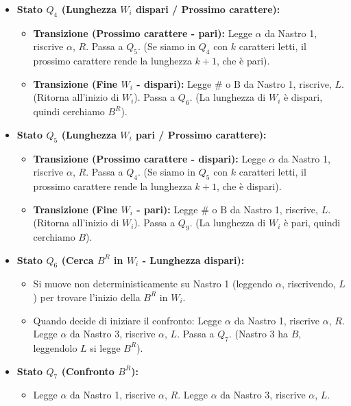 \documentclass[a4paper, 11pt]{book} %
\theoremstyle{definition}
\newcommand{\B}{\text{B}} %
\begin{document}
\begin{itemize}
    \item \textbf{Stato $Q_4$ (Lunghezza $W_i$ dispari / Prossimo carattere):}
        \begin{itemize}
            \item \textbf{Transizione (Prossimo carattere - pari):}
                Legge $\alpha$ da Nastro 1, riscrive $\alpha$, $R$. Passa a $Q_5$.
                (Se siamo in $Q_4$ con $k$ caratteri letti, il prossimo carattere rende la lunghezza $k+1$, che è pari).
            \item \textbf{Transizione (Fine $W_i$ - dispari):}
                Legge $\#$ o $\B$ da Nastro 1, riscrive, $L$. (Ritorna all'inizio di $W_i$).
                Passa a $Q_6$. (La lunghezza di $W_i$ è dispari, quindi cerchiamo $B^R$).
        \end{itemize}
    \item \textbf{Stato $Q_5$ (Lunghezza $W_i$ pari / Prossimo carattere):}
        \begin{itemize}
            \item \textbf{Transizione (Prossimo carattere - dispari):}
                Legge $\alpha$ da Nastro 1, riscrive $\alpha$, $R$. Passa a $Q_4$.
                (Se siamo in $Q_5$ con $k$ caratteri letti, il prossimo carattere rende la lunghezza $k+1$, che è dispari).
            \item \textbf{Transizione (Fine $W_i$ - pari):}
                Legge $\#$ o $\B$ da Nastro 1, riscrive, $L$. (Ritorna all'inizio di $W_i$).
                Passa a $Q_9$. (La lunghezza di $W_i$ è pari, quindi cerchiamo $B$).
        \end{itemize}
    \item \textbf{Stato $Q_6$ (Cerca $B^R$ in $W_i$ - Lunghezza dispari):}
        \begin{itemize}
            \item Si muove non deterministicamente su Nastro 1 (leggendo $\alpha$, riscrivendo, $L$) per trovare l'inizio della $B^R$ in $W_i$.
            \item Quando decide di iniziare il confronto: Legge $\alpha$ da Nastro 1, riscrive $\alpha$, $R$. Legge $\alpha$ da Nastro 3, riscrive $\alpha$, $L$. Passa a $Q_7$.
            (Nastro 3 ha $B$, leggendolo $L$ si legge $B^R$).
        \end{itemize}
    \item \textbf{Stato $Q_7$ (Confronto $B^R$):}
        \begin{itemize}
            \item Legge $\alpha$ da Nastro 1, riscrive $\alpha$, $R$. Legge $\alpha$ da Nastro 3, riscrive $\alpha$, $L$.

\end{itemize}
\end{itemize}
\end{document}
